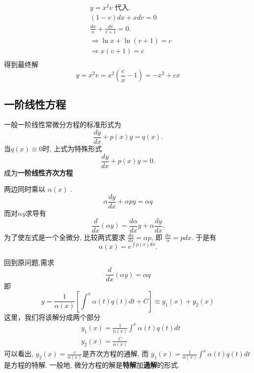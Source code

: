 $$
\begin{aligned}
& y=x^2 v \text { 代入. } \\
& (1-v) d x+x d v=0 \\
& \frac{d x}{x}+\frac{d v}{v+1}=0 . \\
& \Rightarrow \ln x+\ln (v+1)=c \\
& \Rightarrow x(v+1)=c \\
\end{aligned}
$$
得到最终解
\[
    y=x^2 v=x^2\left(\frac{c}{x}-1\right) = -x^2+c x 
\]

\subsection{一阶线性方程}
一般一阶线性常微分方程的标准形式为
\begin{equation}
    \frac{d y}{d x}+p(x) y=q(x).
\end{equation}
当$q(x) \equiv 0$时, 上式为特殊形式
\begin{equation}
    \frac{d y}{d x}+p(x) y = 0.
\end{equation}
成为\textbf{一阶线性齐次方程}

两边同时乘以 $\alpha(x)$ .
\begin{equation}
     \alpha \frac{d y}{d x}+\alpha p y=\alpha q 
\end{equation}
而对$\alpha y$求导有
\begin{equation}
    \frac{d}{d x}(\alpha y)=\frac{d \alpha}{d x} y+\alpha \frac{d y}{d x} .
\end{equation}
为了使左式是一个全微分, 比较两式要求
$\frac{d \alpha}{d x}=\alpha p $, 即 $\frac{d \alpha}{\alpha}=p d x $. 于是有
\begin{equation}
    \alpha(x)=e^{\int p(x) d x}.
\end{equation}

回到原问题,需求
$$\frac{d}{d x}(\alpha y)=\alpha q $$
即
\begin{equation}
    y=\frac{1}{\alpha(x)}\left[\int^x \alpha(t) q(t) dt+C\right] \equiv y_1(x)+y_2(x)
\end{equation}
这里，我们将该解分成两个部分
\begin{equation}
\begin{aligned}
& y_1(x)=\frac{1}{\alpha(x)} \int^x \alpha(t) q(t) d t \\
& y_2(x)=\frac{C}{\alpha(x)}
\end{aligned}
\end{equation}
可以看出, $y_2(x)=\frac{c}{\alpha(x)}$是齐次方程的通解,
而 $y_1(x)=\frac{1}{\alpha(x)} \int^x \alpha(t) q(t) d t$是方程的特解.
一般地, 微分方程的解是\textbf{特解}加\textbf{通解}的形式.

